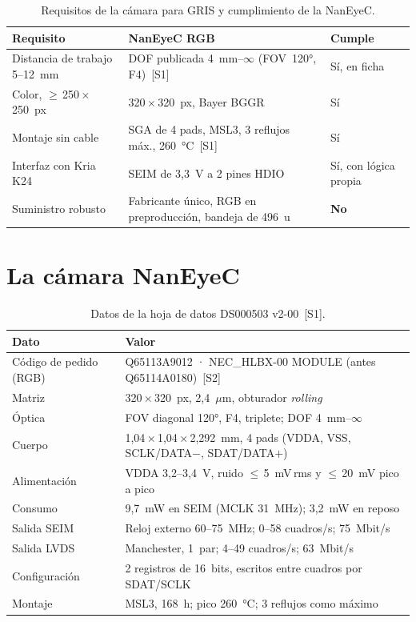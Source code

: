\documentclass[11pt,a4paper]{article}
\begin{document}
\begin{table}[H]\centering
\caption{Requisitos de la cámara para GRIS y cumplimiento de la NanEyeC.}
\small
\begin{tabularx}{\linewidth}{l X l}
\toprule
Requisito & NanEyeC RGB & Cumple \\
\midrule
Distancia de trabajo 5--12~mm & DOF publicada 4~mm--$\infty$ (FOV~120°, F4)~[S1] & Sí, en ficha \\
Color, $\geq$\,250\,$\times$\,250~px & 320\,$\times$\,320~px, Bayer BGGR & Sí \\
Montaje sin cable & SGA de 4 pads, MSL3, 3 reflujos máx., 260~°C~[S1] & Sí \\
Interfaz con Kria K24 & SEIM de 3,3~V a 2 pines HDIO & Sí, con lógica propia \\
Suministro robusto & Fabricante único, RGB en preproducción, bandeja de 496~u & \textbf{No} \\
\bottomrule
\end{tabularx}
\end{table}

\section{La cámara NanEyeC}

\begin{table}[H]\centering
\caption{Datos de la hoja de datos DS000503 v2-00~[S1].}
\small
\begin{tabularx}{\linewidth}{l X}
\toprule
Dato & Valor \\
\midrule
Código de pedido (RGB) & Q65113A9012 · NEC\_HLBX-00 MODULE (antes Q65114A0180)~[S2] \\
Matriz & 320\,$\times$\,320~px, 2,4~$\mu$m, obturador \emph{rolling} \\
Óptica & FOV diagonal 120°, F4, triplete; DOF 4~mm--$\infty$ \\
Cuerpo & 1,04\,$\times$\,1,04\,$\times$\,2,292~mm, 4 pads (VDDA, VSS, SCLK/DATA$-$, SDAT/DATA$+$) \\
Alimentación & VDDA 3,2--3,4~V, ruido $\leq$\,5~mV\,rms y $\leq$\,20~mV pico a pico \\
Consumo & 9,7~mW en SEIM (MCLK 31~MHz); 3,2~mW en reposo \\
Salida SEIM & Reloj externo 60--75~MHz; 0--58 cuadros/s; 75~Mbit/s \\
Salida LVDS & Manchester, 1~par; 4--49 cuadros/s; 63~Mbit/s \\
Configuración & 2 registros de 16~bits, escritos entre cuadros por SDAT/SCLK \\
Montaje & MSL3, 168~h; pico 260~°C; 3 reflujos como máximo \\
\bottomrule
\end{tabularx}
\end{table}
\end{document}
